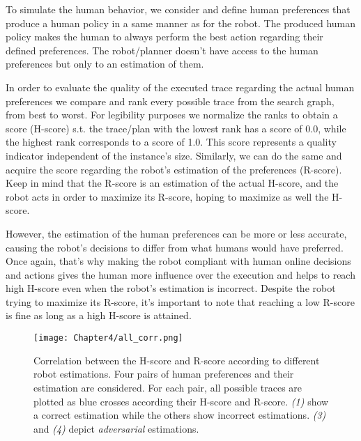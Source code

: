 To simulate the human behavior, we consider and define human preferences that produce a human policy in a same manner as for the robot. The produced human policy makes the human to always perform the best action regarding their defined preferences. The robot/planner doesn't have access to the human preferences but only to an estimation of them.

In order to evaluate the quality of the executed trace regarding the actual human preferences we compare and rank every possible trace from the search graph, from best to worst. For legibility purposes we normalize the ranks to obtain a score (H-score) s.t. the trace/plan with the lowest rank has a score of 0.0, while the highest rank corresponds to a score of 1.0. This score represents a quality indicator independent of the instance's size. 
Similarly, we can do the same and acquire the score regarding the robot's estimation of the preferences (R-score). 
Keep in mind that the R-score is an estimation of the actual H-score, and the robot acts in order to maximize its R-score, hoping to maximize as well the H-score.

However, the estimation of the human preferences can be more or less accurate, causing the robot's decisions to differ from what humans would have preferred. Once again, that's why making the robot compliant with human online decisions and actions gives the human more influence over the execution and helps to reach high H-score even when the robot's estimation is incorrect.
Despite the robot trying to maximize its R-score, it's important to note that reaching a low R-score is fine as long as a high H-score is attained.

\begin{figure}
    \texttt{[image: Chapter4/all\_corr.png]}
    \caption{
    Correlation between the H-score and R-score according to different robot estimations. Four pairs of human preferences and their estimation are considered. For each pair, all possible traces are plotted as blue crosses according their H-score and R-score. \textit{(1)} show a correct estimation while the others show incorrect estimations. \textit{(3)} and \textit{(4)} depict \textit{adversarial} estimations.
    }
    \label{fig:corr}
\end{figure}


